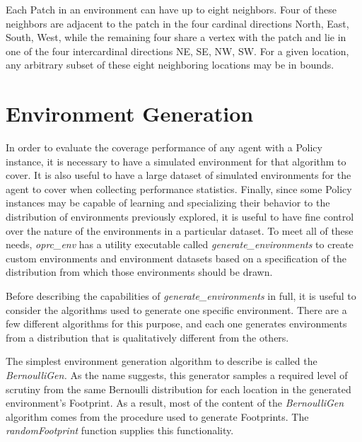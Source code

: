 Each Patch in an environment can have up to eight neighbors. Four of these neighbors are adjacent to the patch in the four cardinal directions {North, East, South, West}, while the remaining four share a vertex with the patch and lie in one of the four intercardinal directions {NE, SE, NW, SW}. For a given location, any arbitrary subset of these eight neighboring locations may be in bounds.


\section{Environment Generation}

In order to evaluate the coverage performance of any agent with a Policy instance, it is necessary to have a simulated environment for that algorithm to cover. It is also useful to have a large dataset of simulated environments for the agent to cover when collecting performance statistics. Finally, since some Policy instances may be capable of learning and specializing their behavior to the distribution of environments previously explored, it is useful to have fine control over the nature of the environments in a particular dataset. To meet all of these needs, \textit{oprc\_env} has a utility executable called \textit{generate\_environments} to create custom environments and environment datasets based on a specification of the distribution from which those environments should be drawn.

Before describing the capabilities of \textit{generate\_environments} in full, it is useful to consider the algorithms used to generate one specific environment. There are a few different algorithms for this purpose, and each one generates environments from a distribution that is qualitatively different from the others.

The simplest environment generation algorithm to describe is called the \textit{BernoulliGen.} As the name suggests, this generator samples a required level of scrutiny from the same Bernoulli distribution for each location in the generated environment's Footprint. As a result, most of the content of the \textit{BernoulliGen} algorithm comes from the procedure used to generate Footprints. The \textit{randomFootprint} function supplies this functionality.  



